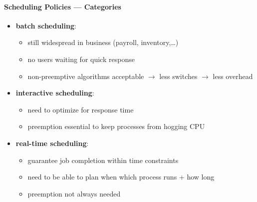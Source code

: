 \paragraph{Scheduling Policies --- Categories}
\begin{itemize}
  \item \textbf{batch scheduling}:
  \begin{itemize}
    \item still widespread in business (payroll, inventory,\dots)
    \item no users waiting for quick response
    \item non-preemptive algorithms acceptable \( \to \) less switches \( \to \) less overhead
  \end{itemize}
  \item \textbf{interactive scheduling}:
  \begin{itemize}
    \item need to optimize for response time
    \item preemption essential to keep processes from hogging CPU
  \end{itemize}
  \item \textbf{real-time scheduling}:
  \begin{itemize}
    \item guarantee job completion within time constraints
    \item need to be able to plan when which process runs + how long
    \item preemption not always needed
  \end{itemize}
\end{itemize}

